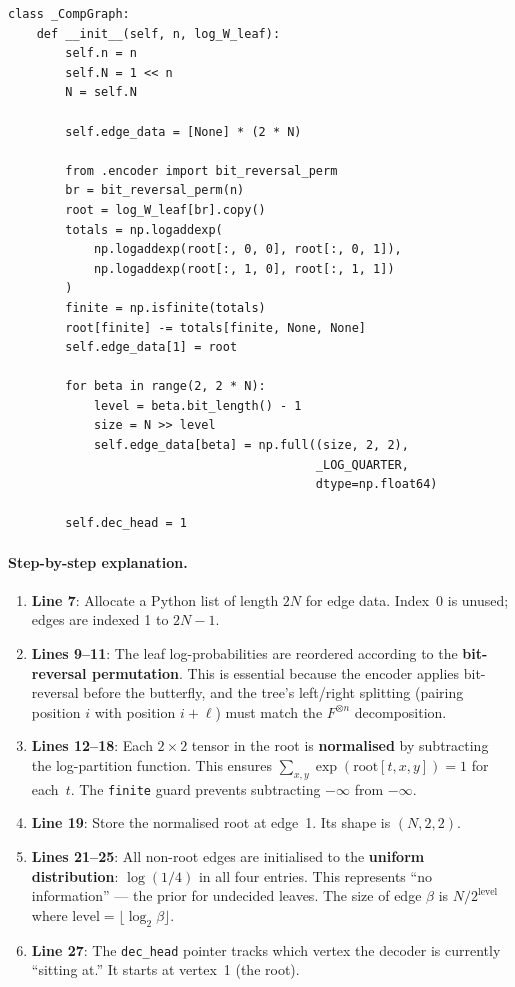 \documentclass[11pt,a4paper]{article}
\begin{document}
\begin{lstlisting}[caption={Graph initialisation (\texttt{\_CompGraph.\_\_init\_\_})}]
class _CompGraph:
    def __init__(self, n, log_W_leaf):
        self.n = n
        self.N = 1 << n
        N = self.N

        self.edge_data = [None] * (2 * N)

        from .encoder import bit_reversal_perm
        br = bit_reversal_perm(n)
        root = log_W_leaf[br].copy()
        totals = np.logaddexp(
            np.logaddexp(root[:, 0, 0], root[:, 0, 1]),
            np.logaddexp(root[:, 1, 0], root[:, 1, 1])
        )
        finite = np.isfinite(totals)
        root[finite] -= totals[finite, None, None]
        self.edge_data[1] = root

        for beta in range(2, 2 * N):
            level = beta.bit_length() - 1
            size = N >> level
            self.edge_data[beta] = np.full((size, 2, 2),
                                           _LOG_QUARTER,
                                           dtype=np.float64)

        self.dec_head = 1
\end{lstlisting}

\paragraph{Step-by-step explanation.}
\begin{enumerate}
    \item \textbf{Line 7}: Allocate a Python list of length $2N$ for edge data. Index~0 is unused; edges are indexed 1 to $2N - 1$.

    \item \textbf{Lines 9--11}: The leaf log-probabilities are reordered according to the \textbf{bit-reversal permutation}. This is essential because the encoder applies bit-reversal before the butterfly, and the tree's left/right splitting (pairing position $i$ with position $i + \ell$) must match the $F^{\otimes n}$ decomposition.

    \item \textbf{Lines 12--18}: Each $2 \times 2$ tensor in the root is \textbf{normalised} by subtracting the log-partition function. This ensures $\sum_{x,y} \exp(\text{root}[t, x, y]) = 1$ for each~$t$. The \texttt{finite} guard prevents subtracting $-\infty$ from $-\infty$.

    \item \textbf{Line 19}: Store the normalised root at edge~1. Its shape is $(N, 2, 2)$.

    \item \textbf{Lines 21--25}: All non-root edges are initialised to the \textbf{uniform distribution}: $\log(1/4)$ in all four entries. This represents ``no information'' --- the prior for undecided leaves. The size of edge $\beta$ is $N / 2^{\mathrm{level}}$ where $\mathrm{level} = \lfloor \log_2 \beta \rfloor$.

    \item \textbf{Line 27}: The \texttt{dec\_head} pointer tracks which vertex the decoder is currently ``sitting at.'' It starts at vertex~1 (the root).
\end{enumerate}
\end{document}
